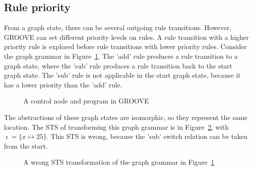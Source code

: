 \subsection{Rule priority}
From a graph state, there can be several outgoing rule transitions. However, GROOVE can set different priority levels on rules. A rule transition with a higher priority rule is explored before rule transitions with lower priority rules. Consider the graph grammar in Figure~\ref{fig:priority_gg}. The 'add' rule produces a rule transition to a graph state, where the 'sub' rule produces a rule transition back to the start graph state. The 'sub' rule is not applicable in the start graph state, because it has a lower priority than the 'add' rule.

\begin{figure}[ht]
  \begin{center}
    \hspace{20px}
    \hspace{20px}
    \hspace{20px}
    \hspace{20px}
  \end{center}
  \caption{A control node and program in GROOVE}
  \label{fig:priority_gg}
\end{figure} 

The abstractions of these graph states are isomorphic, so they represent the same location. The STS of transforming this graph grammar is in Figure~\ref{fig:priority_sts_wrong}, with $\imath = \{x \mapsto 25\}$. This STS is wrong, because the 'sub' switch relation can be taken from the start.

\begin{figure}[ht]
  \begin{center}
    
  \end{center}
  \caption{A wrong STS transformation of the graph grammar in Figure~\ref{fig:priority_gg}}
  \label{fig:priority_sts_wrong}
\end{figure}

